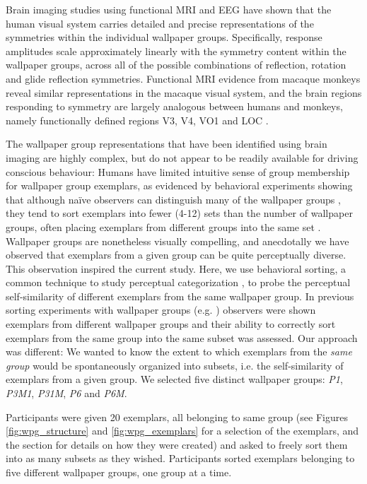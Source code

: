\documentclass[11pt, twoside]{article}
\begin{document}
Brain imaging studies using functional MRI \citep{RN1725} and EEG \citep{RN1959,kohler_clarke_2021} have shown that the human visual system carries detailed and precise representations of the symmetries within the individual wallpaper groups. Specifically, response amplitudes scale approximately linearly with the symmetry content within the wallpaper groups, across all of the possible combinations of reflection, rotation and glide reflection symmetries. Functional MRI evidence from macaque monkeys reveal similar representations in the macaque visual system, and the brain regions responding to symmetry are largely analogous between humans and monkeys, namely functionally defined regions V3, V4, VO1 and LOC \citep{audurier_symmetry_2021}.

The wallpaper group representations that have been identified using brain imaging are highly complex, but do not appear to be readily available for driving conscious behaviour: Humans have limited intuitive sense of group membership for wallpaper group exemplars, as evidenced by behavioral experiments showing that although naïve observers can distinguish many of the wallpaper groups \citep{RN1253}, they tend to sort exemplars into fewer (4-12) sets than the number of wallpaper groups, often placing exemplars from different groups into the same set \citep{RN172}. Wallpaper groups are nonetheless visually compelling, and anecdotally we have observed that exemplars from a given group can be quite perceptually diverse. This observation inspired the current study. Here, we use behavioral sorting, a common technique to study perceptual categorization \citep{Milton2008-ez,Pothos2011-vi}, to probe the perceptual self-similarity of different exemplars from the same wallpaper group. In previous sorting experiments with wallpaper groups (e.g. \citep{RN172}) observers were shown exemplars from different wallpaper groups and their ability to correctly sort exemplars from the same group into the same subset was assessed. Our approach was different: We wanted to know the extent to which exemplars from the \textit{same group} would be spontaneously organized into subsets, i.e. the self-similarity of exemplars from a given group. We selected five distinct wallpaper groups: \textit{P1}, \textit{P3M1}, \textit{P31M}, \textit{P6} and \textit{P6M}.



Participants were given 20 exemplars, all belonging to same group (see Figures \ref{fig:wpg_structure} and \ref{fig:wpg_exemplars} for a selection of the exemplars, and the  section for details on how they were created) and asked to freely sort them into as many subsets as they wished. Participants sorted exemplars belonging to five different wallpaper groups, one group at a time. 
\end{document}
